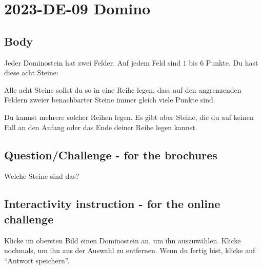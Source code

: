 \documentclass[a4paper,11pt]{report}
\newcommand{\taskGraphicsFolder}{..}
\begin{document}
\section*{\centering{} 2023-DE-09 Domino}


\subsection*{Body}

Jeder Dominostein hat zwei Felder. Auf jedem Feld sind $1$ bis $6$ Punkte. Du hast diese acht Steine:

{\centering%
\par}

Alle acht Steine sollst du so in eine Reihe legen, dass auf den angrenzenden Feldern zweier benachbarter Steine immer gleich viele Punkte sind.

{\centering%
\raisebox{-0.5ex}{} \raisebox{-0.5ex}{}\par}

Du kannst mehrere solcher Reihen legen. Es gibt aber Steine, die du auf keinen Fall an den Anfang oder das Ende deiner Reihe legen kannst.

{\centering%
\par}

{\em


\subsection*{Question/Challenge - for the brochures}

Welche Steine sind das?

}


\subsection*{Interactivity instruction - for the online challenge}

Klicke im obersten Bild einen Dominostein an, um ihn auszuwählen. Klicke nochmals, um ihn aus der Auswahl zu entfernen. Wenn du fertig bist, klicke auf \enquote{Antwort speichern}.

\begingroup
\renewcommand{\arraystretch}{1.5}
\end{document}
